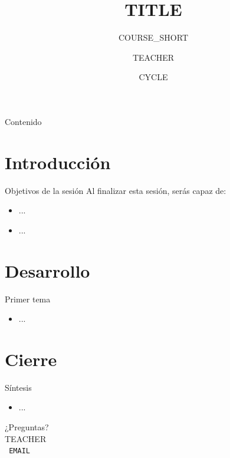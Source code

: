 \documentclass[xcolor=table,aspectratio={{ASPECT}},11pt]{beamer}
\title{ {{TITLE}} }
\subtitle{ {{COURSE_SHORT}} }
\author{ {{TEACHER}} }
\institute{ {{INSTITUTION}} \\ {{UNIVERSITY}} }
\date{ {{CYCLE}} }
\begin{document}
\begin{frame}
  \titlepage
\end{frame}

\begin{frame}{Contenido}
  \tableofcontents
\end{frame}

\section{Introducción}

\begin{frame}{Objetivos de la sesión}
  Al finalizar esta sesión, serás capaz de:
  \begin{itemize}
    \item ...
    \item ...
  \end{itemize}
\end{frame}

\section{Desarrollo}

\begin{frame}{Primer tema}
  \begin{itemize}
    \item ...
  \end{itemize}
\end{frame}

\section{Cierre}

\begin{frame}{Síntesis}
  \begin{itemize}
    \item ...
  \end{itemize}
\end{frame}

\begin{frame}
  \centering
  {\Large ¿Preguntas?}\\[2em]
  {{TEACHER}} \\
  \texttt{ {{EMAIL}} }
\end{frame}
\end{document}
